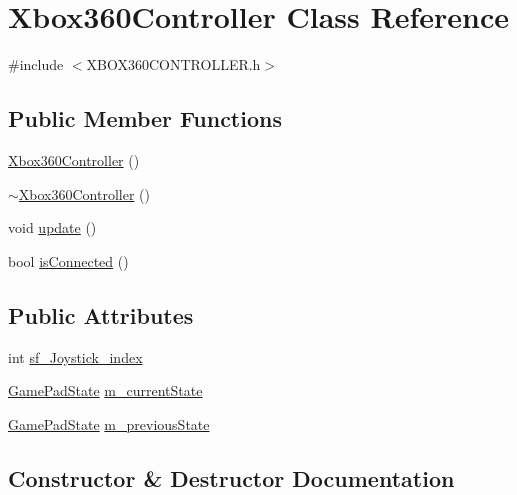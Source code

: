 \hypertarget{class_xbox360_controller}{}\section{Xbox360\+Controller Class Reference}
\label{class_xbox360_controller}


{\ttfamily \#include $<$X\+B\+O\+X360\+C\+O\+N\+T\+R\+O\+L\+L\+E\+R.\+h$>$}

\subsection*{Public Member Functions}
\begin{DoxyCompactItemize}
\item 
\mbox{\hyperlink{class_xbox360_controller_a30980f4f364c005ec78b6df40ce255f9}{Xbox360\+Controller}} ()
\item 
\mbox{\hyperlink{class_xbox360_controller_a4b8fa4e05500c5831eeb434ac54459ce}{$\sim$\+Xbox360\+Controller}} ()
\item 
void \mbox{\hyperlink{class_xbox360_controller_aac924e1c636c81c81f2a19c4a2b62a03}{update}} ()
\item 
bool \mbox{\hyperlink{class_xbox360_controller_afc98be4195611706fcb57b942d38de1c}{is\+Connected}} ()
\end{DoxyCompactItemize}
\subsection*{Public Attributes}
\begin{DoxyCompactItemize}
\item 
int \mbox{\hyperlink{class_xbox360_controller_afe596ab17748d78b7c09495fe04df62d}{sf\+\_\+\+Joystick\+\_\+index}}
\item 
\mbox{\hyperlink{struct_game_pad_state}{Game\+Pad\+State}} \mbox{\hyperlink{class_xbox360_controller_ae16ab40180c31e353d1a99696508279a}{m\+\_\+current\+State}}
\item 
\mbox{\hyperlink{struct_game_pad_state}{Game\+Pad\+State}} \mbox{\hyperlink{class_xbox360_controller_a42cfca3db7ee70dd11fb39d30b3d5cb5}{m\+\_\+previous\+State}}
\end{DoxyCompactItemize}


\subsection{Constructor \& Destructor Documentation}
\mbox{\label{class_xbox360_controller_a30980f4f364c005ec78b6df40ce255f9}} 

